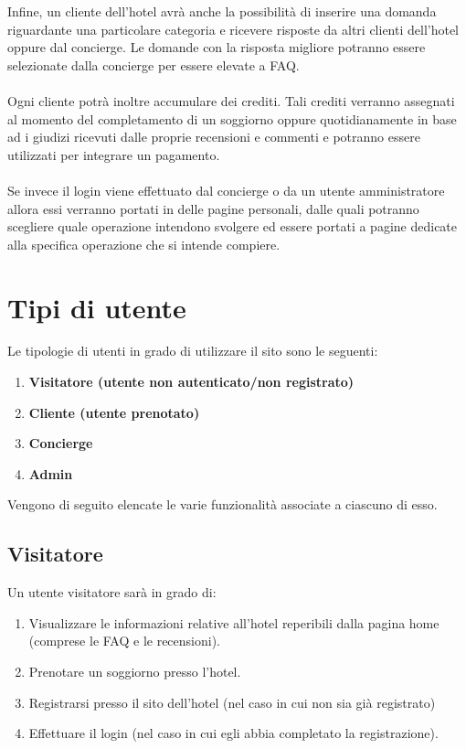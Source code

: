 \documentclass [a4paper, 12pt]{book}
\begin{document}
Infine, un cliente dell'hotel avrà anche la possibilità di inserire una domanda riguardante una particolare categoria e ricevere risposte da altri clienti dell'hotel oppure dal concierge. Le domande con la risposta migliore potranno essere selezionate dalla concierge per essere elevate a FAQ.  \\\\
Ogni cliente potrà inoltre accumulare dei crediti. Tali crediti verranno assegnati al momento del completamento di un soggiorno oppure quotidianamente in base ad i giudizi ricevuti dalle proprie recensioni e commenti e potranno essere utilizzati per integrare un pagamento.\\\\
Se invece il login viene effettuato dal concierge o da un utente amministratore allora essi verranno portati in delle pagine personali, dalle quali potranno scegliere quale operazione intendono svolgere ed essere portati a pagine dedicate alla specifica operazione che si intende compiere.

\medskip

\section{Tipi di utente}
Le tipologie di utenti in grado di utilizzare il sito sono le seguenti:
\begin{enumerate}
\item \textbf{Visitatore (utente non autenticato/non registrato)}
\item \textbf{Cliente (utente prenotato)}
\item \textbf{Concierge}
\item \textbf{Admin}
\end{enumerate}
Vengono di seguito elencate le varie funzionalità associate a ciascuno di esso.

\subsection{Visitatore}
Un utente visitatore sarà in grado di:
\begin{enumerate}
\item Visualizzare le informazioni relative all'hotel reperibili dalla pagina home (comprese le FAQ e le recensioni).
\item Prenotare un soggiorno presso l'hotel.
\item Registrarsi presso il sito dell'hotel (nel caso in cui non sia già registrato)
\item Effettuare il login (nel caso in cui egli abbia completato la registrazione).
\end{enumerate}
\end{document}
